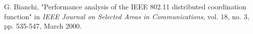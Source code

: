  G. Bianchi, "Performance analysis of the IEEE 802.11 distributed coordination function" in {\it IEEE Journal on Selected Areas in Communications}, vol. 18, no. 3, pp. 535-547, March 2000.